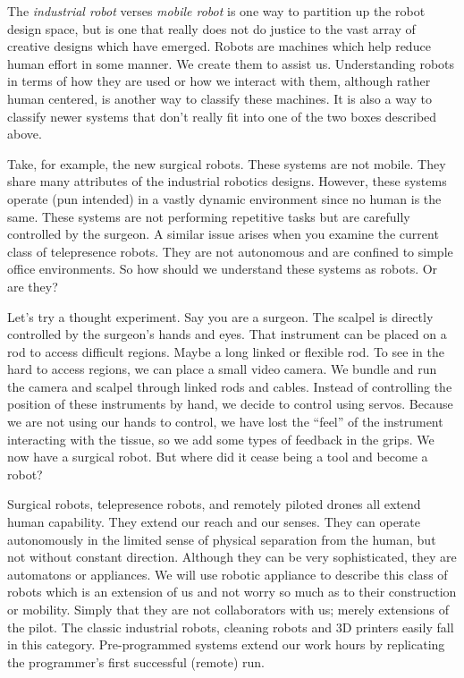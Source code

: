 The \emph{industrial robot} verses \emph{mobile robot} is one way to
partition up the robot design space, but is one that really does not do
justice to the vast array of creative designs which have emerged. Robots
are machines which help reduce human effort in some manner. We create
them to assist us. Understanding robots in terms of how they are used or
how we interact with them, although rather human centered, is another
way to classify these machines. It is also a way to classify newer
systems that don't really fit into one of the two boxes described above.

Take, for example, the new surgical robots. These systems are not
mobile. They share many attributes of the industrial robotics designs.
However, these systems operate (pun intended) in a vastly dynamic
environment since no human is the same. These systems are not performing
repetitive tasks but are carefully controlled by the surgeon. A similar
issue arises when you examine the current class of telepresence robots.
They are not autonomous and are confined to simple office environments.
So how should we understand these systems as robots. Or are they?

Let's try a thought experiment. Say you are a surgeon. The scalpel is
directly controlled by the surgeon's hands and eyes. That instrument can
be placed on a rod to access difficult regions. Maybe a long linked or
flexible rod. To see in the hard to access regions, we can place a small
video camera. We bundle and run the camera and scalpel through linked
rods and cables. Instead of controlling the position of these
instruments by hand, we decide to control using servos. Because we are
not using our hands to control, we have lost the ``feel'' of the
instrument interacting with the tissue, so we add some types of feedback
in the grips. We now have a surgical robot. But where did it cease being
a tool and become a robot?

Surgical robots, telepresence robots, and remotely piloted drones all
extend human capability. They extend our reach and our senses. They can
operate autonomously in the limited sense of physical separation from
the human, but not without constant direction. Although they can be very
sophisticated, they are automatons or appliances. We will use robotic
appliance to describe this class of robots which is an extension of us
and not worry so much as to their construction or mobility. Simply that
they are not collaborators with us; merely extensions of the pilot. The
classic industrial robots, cleaning robots and 3D printers easily fall
in this category. Pre-programmed systems extend our work hours by
replicating the programmer's first successful (remote) run.

